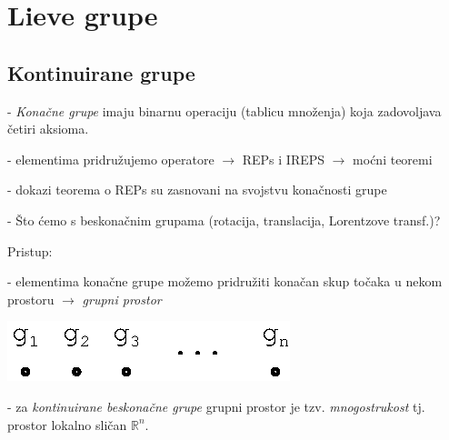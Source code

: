 
\chapter{Lieve grupe}
\label{chap:lie}

\section{Kontinuirane grupe}


- \emph{Konačne grupe} imaju binarnu operaciju (tablicu množenja)
koja zadovoljava četiri aksioma.

- elementima pridružujemo operatore $\to$ REPs i IREPS $\to$ moćni teoremi

- dokazi teorema o REPs su zasnovani na svojstvu konačnosti grupe

- Što ćemo s beskonačnim grupama (rotacija, translacija, Lorentzove transf.)?

Pristup:

- elementima konačne grupe možemo pridružiti konačan skup točaka u nekom
 prostoru $\to$ \emph{grupni prostor}

\centerline{\includegraphics[scale=1.0]{pics/grupni_prostor.eps}}

- za \emph{kontinuirane beskonačne grupe} grupni prostor je tzv.
 \emph{mnogostrukost} tj. prostor lokalno sličan $\mathbb{R}^n$.


